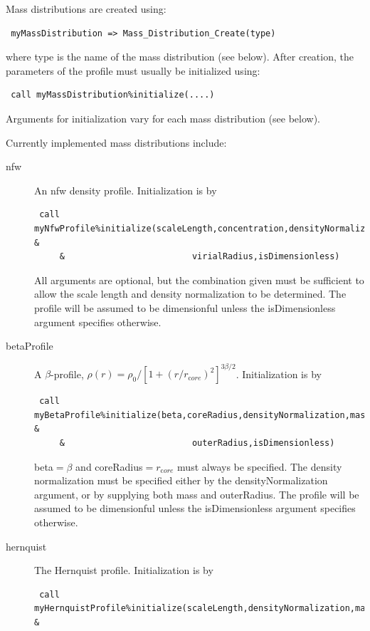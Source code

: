 Mass distributions are created using:
\begin{verbatim}
 myMassDistribution => Mass_Distribution_Create(type)
\end{verbatim}
where {\normalfont \ttfamily type} is the name of the mass distribution (see below). After creation, the parameters of the profile must usually be initialized using:
\begin{verbatim}
 call myMassDistribution%initialize(....)
\end{verbatim}
Arguments for initialization vary for each mass distribution (see below).

Currently implemented mass distributions include:
\begin{description}
 \item [{\normalfont \ttfamily nfw}] An \gls{nfw} \citep{navarro_universal_1997} density profile. Initialization is by
\begin{verbatim}
 call myNfwProfile%initialize(scaleLength,concentration,densityNormalization,mass, &
     &                         virialRadius,isDimensionless)
\end{verbatim}
All arguments are optional, but the combination given must be sufficient to allow the scale length and density normalization to be determined. The profile will be assumed to be dimensionful unless the {\normalfont \ttfamily isDimensionless} argument specifies otherwise.
 \item [{\normalfont \ttfamily betaProfile}] A $\beta$-profile, $\rho(r)=\rho_0/[1+(r/r_{\mathrm core})^2]^{3\beta/2}$. Initialization is by
\begin{verbatim}
 call myBetaProfile%initialize(beta,coreRadius,densityNormalization,mass, &
     &                         outerRadius,isDimensionless)
\end{verbatim}
 {\normalfont \ttfamily beta}$=\beta$ and {\normalfont \ttfamily coreRadius}$=r_{\mathrm core}$ must always be specified. The density normalization must be specified either by the {\normalfont \ttfamily densityNormalization} argument, or by supplying both {\normalfont \ttfamily mass} and {\normalfont \ttfamily outerRadius}. The profile will be assumed to be dimensionful unless the {\normalfont \ttfamily isDimensionless} argument specifies otherwise.
 \item [{\normalfont \ttfamily hernquist}] The Hernquist \citep{hernquist_analytical_1990} profile. Initialization is by
\begin{verbatim}
 call myHernquistProfile%initialize(scaleLength,densityNormalization,mass, &

\end{verbatim}
\end{description}
